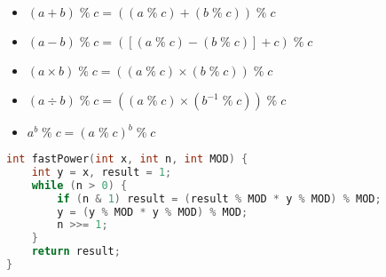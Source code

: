 \begin{multicols}{2}
\begin{itemize}
	\item $\left(a + b\right) \;\%\; c = 
	      \left(\left(a \;\%\; c\right) + 
	      \left(b \;\%\; c\right)\right) \;\%\; c$
	\item $\left(a - b\right) \;\%\; c = 
	      \left(\left[\left(a \;\%\; c\right) -
	      \left(b \;\%\; c\right)\right] + c\right) \;\%\; c$
	\item $\left(a \times b\right) \;\%\; c = 
	      \left(\left(a \;\%\; c\right) \times
	      \left(b \;\%\; c\right)\right) \;\%\; c$
	
	\vfill
	
	\item $\left(a \div b\right) \;\%\; c = 
	      \left(\left(a \;\%\; c\right) \times
	      \left(b^{-1} \;\%\; c\right)\right) \;\%\; c$
	\item $a^{b} \;\%\; c = \left(a \;\%\; c\right)^{b} \;\%\; c$
\end{itemize}
\end{multicols}

\begin{lstlisting}[language=C++, title=Algoritmo de Exponenciação Modular]
int fastPower(int x, int n, int MOD) {
    int y = x, result = 1;
    while (n > 0) {
        if (n & 1) result = (result % MOD * y % MOD) % MOD;
        y = (y % MOD * y % MOD) % MOD;
        n >>= 1;
    }
    return result;
}
\end{lstlisting}
